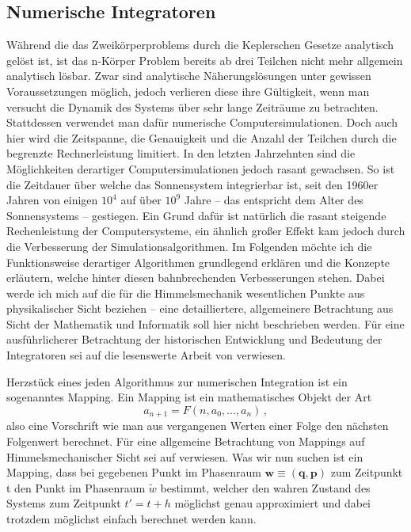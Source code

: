 \documentclass[12pt,a4paper,twoside]{article}
\renewcommand{\cite}{\citep}
\renewcommand{\vec}{\mathbf}
\begin{document}
\subsection{Numerische Integratoren}
Während die das Zweikörperproblems durch die Keplerschen Gesetze analytisch gelöst ist, ist das n-Körper Problem bereits ab drei Teilchen nicht mehr allgemein analytisch lösbar.
Zwar sind analytische Näherungslösungen unter gewissen Voraussetzungen möglich, jedoch verlieren diese ihre Gültigkeit, wenn man versucht die Dynamik des Systems über sehr lange Zeiträume zu betrachten. Stattdessen verwendet man dafür numerische Computersimulationen.
Doch auch hier wird die Zeitspanne, die Genauigkeit und die Anzahl der Teilchen durch die begrenzte Rechnerleistung limitiert.
In den letzten Jahrzehnten sind die Möglichkeiten derartiger Computersimulationen jedoch rasant gewachsen. So ist die Zeitdauer über welche das Sonnensystem integrierbar ist, seit den 1960er Jahren von einigen $10^4$ auf über $10^9$ Jahre – das entspricht dem Alter des Sonnensystems – gestiegen. Ein Grund dafür ist natürlich die rasant steigende Rechenleistung der Computersysteme, ein ähnlich großer Effekt kam jedoch durch die Verbesserung der Simulationsalgorithmen\cite{Morbidelli2002}. Im Folgenden möchte ich die Funktionsweise derartiger Algorithmen grundlegend erklären und die Konzepte erläutern, welche hinter diesen bahnbrechenden Verbesserungen stehen. Dabei werde ich mich auf die für die Himmelsmechanik wesentlichen Punkte aus physikalischer Sicht beziehen -- eine detailliertere, allgemeinere Betrachtung aus Sicht der Mathematik und Informatik soll hier nicht beschrieben werden.
Für eine ausführlicherer Betrachtung der historischen Entwicklung und Bedeutung der Integratoren sei auf die lesenswerte Arbeit von \cite{Morbidelli2002} verwiesen.

Herzstück eines jeden Algorithmus zur numerischen Integration ist ein sogenanntes Mapping. Ein Mapping ist ein mathematisches Objekt der Art
\begin{equation}
a_{n+1} = F(n,a_0,...,a_n) \,,
\end{equation}
also eine Vorschrift wie man aus vergangenen Werten einer Folge den nächsten Folgenwert berechnet. Für eine allgemeine Betrachtung von Mappings auf Himmelsmechanischer Sicht sei auf \cite{Dvorak2005} verwiesen.
Was wir nun suchen ist ein Mapping, dass bei gegebenen Punkt im Phasenraum $\vec{w}\equiv(\vec{q},\vec{p})$ zum Zeitpunkt t den Punkt im Phasenraum $\tilde{w}$ bestimmt, welcher den wahren Zustand des Systems zum Zeitpunkt $t'=t+h$ möglichst genau approximiert und dabei trotzdem möglichst einfach berechnet werden kann\cite{Binney2008}.
\end{document}

